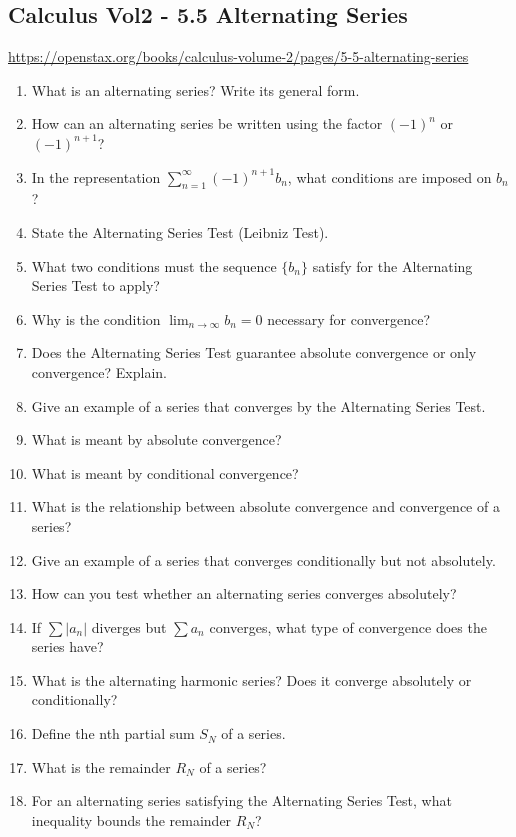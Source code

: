 \subsection{Calculus Vol2 - 5.5 Alternating Series}

\url{https://openstax.org/books/calculus-volume-2/pages/5-5-alternating-series}

\begin{enumerate}
  \item What is an alternating series? Write its general form.
  \item How can an alternating series be written using the factor \((-1)^{n}\) or \((-1)^{n+1}\)?
  \item In the representation \(\sum_{n=1}^{\infty}(-1)^{n+1}b_{n}\), what conditions are imposed on \(b_{n}\)?
  \item State the Alternating Series Test (Leibniz Test).
  \item What two conditions must the sequence \(\{b_{n}\}\) satisfy for the Alternating Series Test to apply?
  \item Why is the condition \(\lim_{n \to \infty}b_{n} = 0\) necessary for convergence?
  \item Does the Alternating Series Test guarantee absolute convergence or only convergence? Explain.
  \item Give an example of a series that converges by the Alternating Series Test.
  \item What is meant by absolute convergence?
  \item What is meant by conditional convergence?
  \item What is the relationship between absolute convergence and convergence of a series?
  \item Give an example of a series that converges conditionally but not absolutely.
  \item How can you test whether an alternating series converges absolutely?
  \item If \(\sum |a_{n}|\) diverges but \(\sum a_{n}\) converges, what type of convergence does the series have?
  \item What is the alternating harmonic series? Does it converge absolutely or conditionally?
  \item Define the nth partial sum \(S_{N}\) of a series.
  \item What is the remainder \(R_{N}\) of a series?
  \item For an alternating series satisfying the Alternating Series Test, what inequality bounds the remainder \(R_{N}\)?

\end{enumerate}
